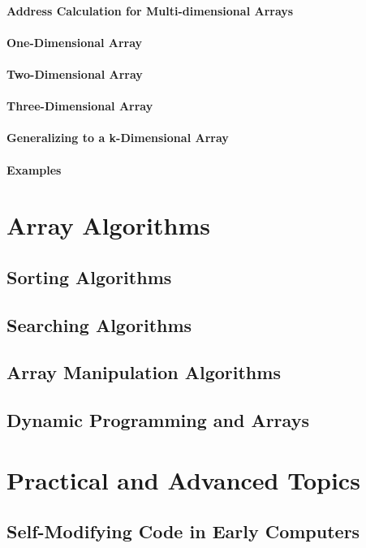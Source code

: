 \documentclass[12pt, oneside]{book}
\begin{document}
	\subsubsection{Address Calculation for Multi-dimensional Arrays}
	\subsubsection{One-Dimensional Array}
	\subsubsection{Two-Dimensional Array}
	\subsubsection{Three-Dimensional Array}
	\subsubsection{Generalizing to a k-Dimensional Array}
	\subsubsection{Examples}
	\chapter{Array Algorithms}
	\section{Sorting Algorithms}
	\section{Searching Algorithms}
	\section{Array Manipulation Algorithms}
	\section{Dynamic Programming and Arrays}
	\chapter{Practical and Advanced Topics}
	\section{Self-Modifying Code in Early Computers}
\end{document}
